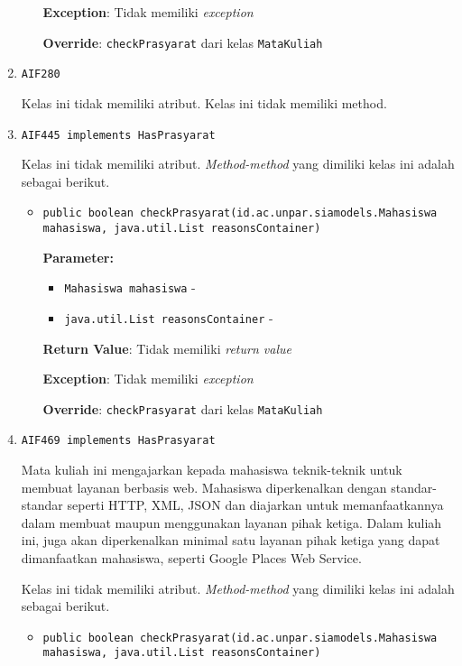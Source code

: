 \documentclass{article}
\begin{document}
\begin{enumerate}
\begin{itemize}
\textbf{Exception}: Tidak memiliki \textit{exception}

\textbf{Override}: \texttt{checkPrasyarat} dari kelas \texttt{MataKuliah}

\end{itemize}
\item \texttt{AIF280}



Kelas ini tidak memiliki atribut. Kelas ini tidak memiliki method. \item \texttt{AIF445 implements HasPrasyarat}



Kelas ini tidak memiliki atribut. \textit{Method-method} yang dimiliki kelas ini adalah sebagai berikut.
\begin{itemize}
\item \texttt{public boolean checkPrasyarat(id.ac.unpar.siamodels.Mahasiswa mahasiswa, java.util.List reasonsContainer)}

\textbf{Parameter:}
\begin{itemize}
\item \texttt{Mahasiswa mahasiswa} - 
\item \texttt{java.util.List reasonsContainer} - 
\end{itemize}
\textbf{Return Value}: Tidak memiliki \textit{return value}

\textbf{Exception}: Tidak memiliki \textit{exception}

\textbf{Override}: \texttt{checkPrasyarat} dari kelas \texttt{MataKuliah}

\end{itemize}
\item \texttt{AIF469 implements HasPrasyarat}

Mata kuliah ini mengajarkan kepada mahasiswa teknik-teknik untuk membuat 
 layanan berbasis web. Mahasiswa diperkenalkan dengan standar-standar seperti 
 HTTP, XML, JSON dan diajarkan untuk memanfaatkannya dalam membuat maupun 
 menggunakan layanan pihak ketiga. Dalam kuliah ini, juga akan diperkenalkan 
 minimal satu layanan pihak ketiga yang dapat dimanfaatkan mahasiswa, seperti 
 Google Places Web Service.

Kelas ini tidak memiliki atribut. \textit{Method-method} yang dimiliki kelas ini adalah sebagai berikut.
\begin{itemize}
\item \texttt{public boolean checkPrasyarat(id.ac.unpar.siamodels.Mahasiswa mahasiswa, java.util.List reasonsContainer)}


\end{itemize}
\end{enumerate}
\end{document}
